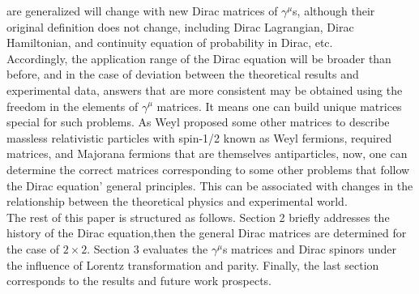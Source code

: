\documentclass[twocolumn,aps,prb,showpacs]{revtex4-1}
\begin{document}
are generalized will change with new Dirac matrices of $ \gamma^{\mu} $s, although their original
definition does not change, including Dirac Lagrangian, Dirac Hamiltonian, and continuity
equation of probability in Dirac, etc.\\
Accordingly, the application range of the Dirac equation will be broader than before, and in
the case of deviation between the theoretical results and experimental data, answers that are
more consistent may be obtained using the freedom in the elements of $ \gamma^{\mu} $ matrices. It means
one can build unique matrices special for such problems. As Weyl proposed some other
matrices to describe massless relativistic particles with spin-1/2 known as Weyl fermions,
required matrices, and Majorana fermions that are themselves antiparticles\cite{Ref15}, now, one can
determine the correct matrices corresponding to some other problems that follow the Dirac
equation' general principles. This can be associated with changes in the relationship between
the theoretical physics and experimental world.\\
The rest of this paper is structured as follows. Section 2 briefly addresses the history of the
Dirac equation,then the general Dirac matrices are determined for the case
of $ 2 \times 2 $. Section 3 evaluates the
$ \gamma^{\mu} $s matrices and Dirac spinors under the influence of Lorentz transformation and parity.
Finally, the last section corresponds to the results and future work prospects.
\end{document}
